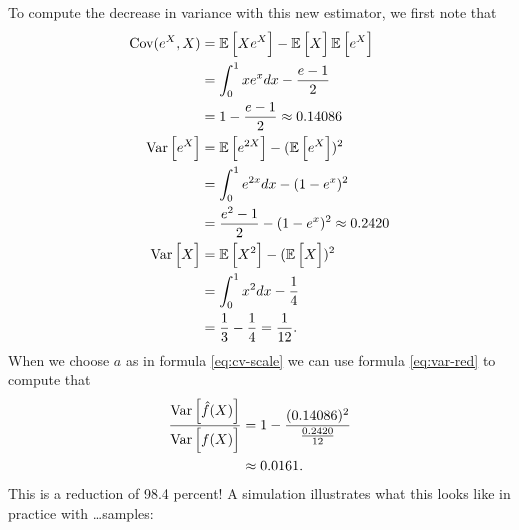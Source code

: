 To compute the decrease in variance with this new estimator, we first note that
\begin{align*}
    \operatorname{Cov}(e^X, X) &= \operatorname{\mathbb{E}} \Big[ Xe^X \Big] - \operatorname{\mathbb{E}} \Big[ X \Big]\operatorname{\mathbb{E}} \Big[ e^X \Big] \\
        &= \int_0^1 xe^x dx - \frac{e-1}{2} \\
        &= 1 - \frac{e-1}{2} \approx 0.14086 \\
    \operatorname{Var} \Big[ e^X \Big] &= \operatorname{\mathbb{E}} \Big[ e^{2X} \Big] - (\operatorname{\mathbb{E}} \Big[ e^X \Big])^2 \\
        &= \int_0^1 e^{2x} dx - (1 - e^x)^2 \\
        &= \frac{e^2 - 1}{2}  - (1 - e^x)^2 \approx 0.2420 \\
    \operatorname{Var} \Big[ X \Big] &= \operatorname{\mathbb{E}} \Big[ X^2 \Big] - (\operatorname{\mathbb{E}} \Big[ X \Big])^2 \\
        &= \int_0^1 x^2 dx - \frac{1}{4} \\
        &= \frac{1}{3} - \frac{1}{4} = \frac{1}{12}.
\end{align*}
When we choose $a$ as in formula \ref{eq:cv-scale} we can use formula \ref{eq:var-red} to compute that
\begin{align*}
    \frac{ \operatorname{Var} \Big[ \hat{f}(X) \Big] }{ \operatorname{Var} \Big[ f(X) \Big]} &= 1 - \frac{(0.14086)^2}{\frac{0.2420}{12}} \\
        &\approx 0.0161.
\end{align*}
This is a reduction of 98.4 percent! A simulation illustrates what this looks like in practice with \dots samples:
